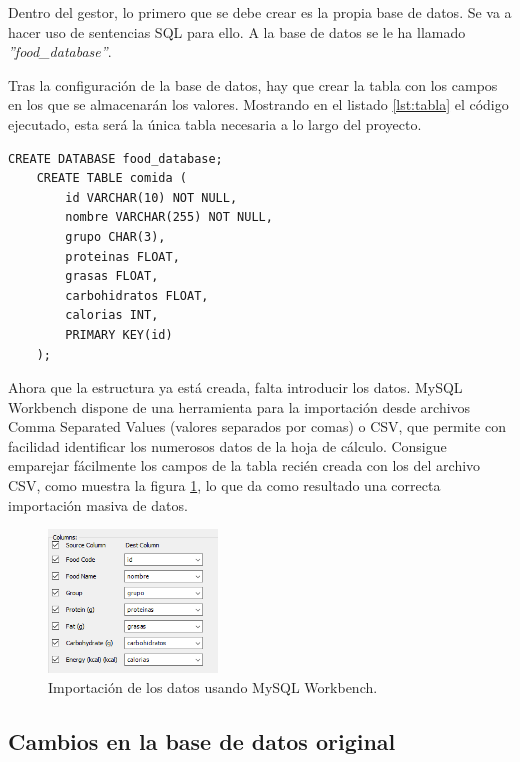 Dentro del gestor, lo primero que se debe crear es la propia base de datos. Se va a hacer uso de sentencias SQL para ello. A la base de datos se le ha llamado \textit{''food\_database''}.

\newpage

Tras la configuración de la base de datos, hay que crear la tabla con los campos en los que se almacenarán los valores. Mostrando en el listado \ref{lst:tabla} el código ejecutado, esta será la única tabla necesaria a lo largo del proyecto.

\begin{lstlisting}[style=sqlstyle, caption=Creación de la tabla y sus campos., label={lst:tabla}]
    CREATE DATABASE food_database;
    CREATE TABLE comida (
        id VARCHAR(10) NOT NULL,
        nombre VARCHAR(255) NOT NULL,
        grupo CHAR(3),
        proteinas FLOAT,
        grasas FLOAT,
        carbohidratos FLOAT,
        calorias INT,
        PRIMARY KEY(id)
    );
\end{lstlisting}

Ahora que la estructura ya está creada, falta introducir los datos. MySQL Workbench dispone de una herramienta para la importación desde archivos Comma Separated Values (valores separados por comas) o CSV, que permite con facilidad identificar los numerosos datos de la hoja de cálculo. Consigue emparejar fácilmente los campos de la tabla recién creada con los del archivo CSV, como muestra la figura \ref{fig:importacion}, lo que da como resultado una correcta importación masiva de datos.

\begin{figure}[H]
    \centering
    \includegraphics[width=0.4\textwidth]{figures/importacion.png}
    \caption{Importación de los datos usando MySQL Workbench.}
    \label{fig:importacion}
\end{figure}

\subsection{Cambios en la base de datos original}

